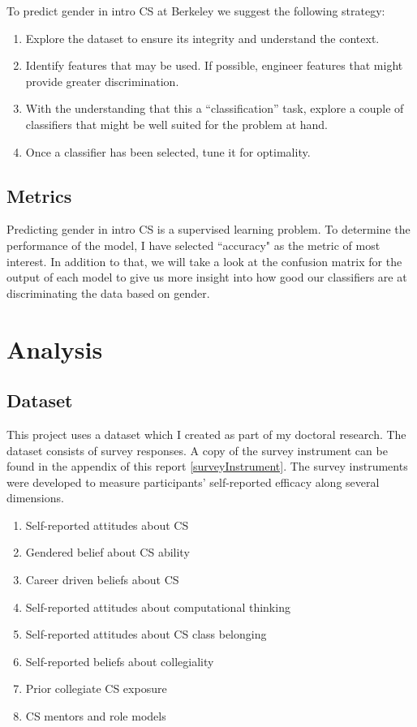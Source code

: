 To predict gender in intro CS at Berkeley we suggest the following strategy:
\begin{enumerate}%
\item Explore the dataset to ensure its integrity and understand the context.
\item Identify features that may be used. If possible, engineer features that might provide greater discrimination.
\item With the understanding that this a ``classification'' task, explore a couple of classifiers that might be well suited for the problem at hand.
\item Once a classifier has been selected, tune it for optimality.
\end{enumerate}

\section*{Metrics}


Predicting gender in intro CS is a supervised learning problem. To determine the performance of the model, I have selected ``accuracy" as the metric of most interest. In addition to that, we will take a look at the confusion matrix for the output of each model to give us more insight into how good our classifiers are at discriminating the data based on gender. 


\chapter*{Analysis}

\section* {Dataset}
This project uses a dataset which I created as part of my doctoral research. The dataset consists of survey responses. A copy of the survey instrument can be found in the appendix of this report \ref{surveyInstrument}. The survey instruments were developed to measure participants' self-reported efficacy along several dimensions. 

\begin{enumerate}%
\item Self-reported attitudes about CS
\item Gendered belief about CS ability
\item Career driven beliefs about CS
\item Self-reported attitudes about computational thinking
\item Self-reported attitudes about CS class belonging
\item Self-reported beliefs about collegiality
\item Prior collegiate CS exposure
\item CS mentors and role models
\end{enumerate}




